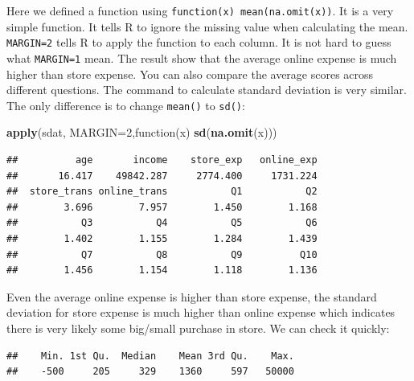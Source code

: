 \documentclass[12pt,]{krantz}
\newenvironment{Shaded}{\begin{snugshade}}{\end{snugshade}}
\newcommand{\KeywordTok}[1]{\textcolor[rgb]{0.13,0.29,0.53}{\textbf{{#1}}}}
\newcommand{\DataTypeTok}[1]{\textcolor[rgb]{0.13,0.29,0.53}{{#1}}}
\newcommand{\DecValTok}[1]{\textcolor[rgb]{0.00,0.00,0.81}{{#1}}}
\newcommand{\NormalTok}[1]{{#1}}
\theoremstyle{definition}
\theoremstyle{definition}
\theoremstyle{remark}
\begin{document}
Here we defined a function using \texttt{function(x)\ mean(na.omit(x))}.
It is a very simple function. It tells R to ignore the missing value
when calculating the mean. \texttt{MARGIN=2} tells R to apply the
function to each column. It is not hard to guess what \texttt{MARGIN=1}
mean. The result show that the average online expense is much higher
than store expense. You can also compare the average scores across
different questions. The command to calculate standard deviation is very
similar. The only difference is to change \texttt{mean()} to
\texttt{sd()}:

\begin{Shaded}
\begin{Highlighting}[]
\KeywordTok{apply}\NormalTok{(sdat, }\DataTypeTok{MARGIN=}\DecValTok{2}\NormalTok{,function(x) }\KeywordTok{sd}\NormalTok{(}\KeywordTok{na.omit}\NormalTok{(x)))}
\end{Highlighting}
\end{Shaded}

\begin{verbatim}
##          age       income    store_exp   online_exp 
##       16.417    49842.287     2774.400     1731.224 
##  store_trans online_trans           Q1           Q2 
##        3.696        7.957        1.450        1.168 
##           Q3           Q4           Q5           Q6 
##        1.402        1.155        1.284        1.439 
##           Q7           Q8           Q9          Q10 
##        1.456        1.154        1.118        1.136
\end{verbatim}

Even the average online expense is higher than store expense, the
standard deviation for store expense is much higher than online expense
which indicates there is very likely some big/small purchase in store.
We can check it quickly:

\begin{Shaded}
\end{Shaded}

\begin{verbatim}
##    Min. 1st Qu.  Median    Mean 3rd Qu.    Max. 
##    -500     205     329    1360     597   50000
\end{verbatim}

\begin{Shaded}
\end{Shaded}
\end{document}
